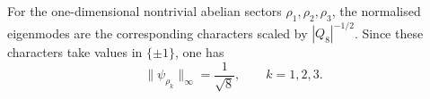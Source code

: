   For the one-dimensional nontrivial abelian sectors $\rho_1, \rho_2, \rho_3$,
  the normalised eigenmodes are the corresponding characters scaled by
  $|Q_8|^{-1/2}$.
  Since these characters take values in $\{\pm 1\}$, one has
  \begin{equation}
    \|\psi_{\rho_k}\|_\infty = \frac{1}{\sqrt{8}},
    \qquad
    k = 1,2,3.
  \end{equation}
